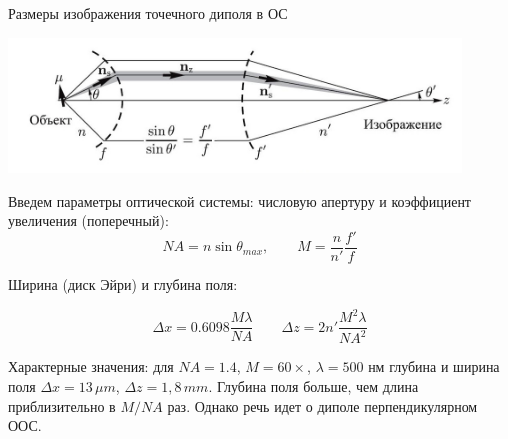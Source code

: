 \documentclass[9pt, compress, xcolor=table]{beamer}
\begin{document}
\begin{frame}{Размеры изображения точечного диполя в ОС}

\begin{center}
\includegraphics[width=0.9\textwidth]{fig4_01}
\end{center}

{\small Введем параметры оптической системы: числовую апертуру и коэффициент увеличения
(поперечный):}
\begin{equation*}
NA = n \sin \theta_{max},\qquad M = \frac{n}{n'} \frac{f'}{f}
\end{equation*}

{\small Ширина (диск Эйри) и глубина поля:}

\begin{equation*}
\Delta x = 0.6098 \frac{M \lambda}{NA}\qquad \Delta z = 2 n'\frac{M^2 \lambda}{NA^2}
\end{equation*}

{\small Характерные значения: для $NA = 1.4$, $M = 60\times$, $\lambda = 500$ нм глубина и ширина
поля $\Delta x = 13\,\mu m$, $\Delta z = 1,8\,mm$. Глубина поля больше, чем длина приблизительно в $M/NA$ раз. Однако речь идет о диполе перпендикулярном ООС.}
\end{frame}
\end{document}
